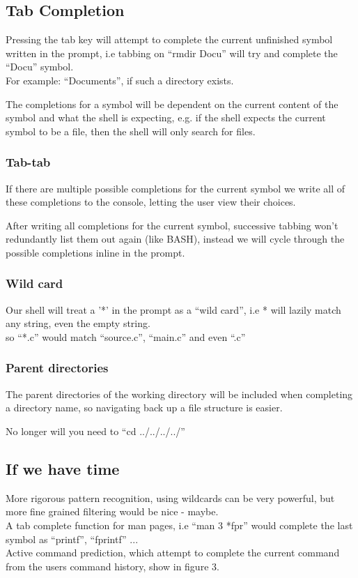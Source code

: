 \documentclass[a4paper,12pt]{article}
\begin{document}
\pagebreak
\subsection*{Tab Completion}

Pressing the tab key will attempt to complete the current unfinished symbol written in the prompt, i.e tabbing on ``rmdir Docu'' will try and complete the ``Docu'' symbol.\\
For example: ``Documents'', if such a directory exists.

The completions for a symbol will be dependent on the current content of the symbol and what the shell is expecting, e.g. if the shell expects the current symbol to be a file, then the shell will only search for files.

\subsubsection*{Tab-tab}
If there are multiple possible completions for the current symbol we write all of these completions to the console, letting the user view their choices.

After writing all completions for the current symbol, successive tabbing  won't redundantly list them out again (like BASH), instead we will cycle through the possible completions inline in the prompt.  

\subsubsection*{Wild card}
Our shell will treat a '*' in the prompt as a ``wild card'', i.e * will lazily match any string, even the empty string. \\
so ``*.c'' would match ``source.c'', ``main.c'' and even ``.c''

\subsubsection*{Parent directories}

The parent directories of the working directory will be included when completing a directory name, so navigating back up a file structure is easier.

No longer will you need to ``cd ../../../../''

\subsection*{If we have time}
More rigorous pattern recognition, using wildcards can be very powerful, but more fine grained filtering would be nice - maybe.\\[0.5cm]
A tab complete function for man pages, i.e ``man 3 *fpr'' would complete the last symbol as ``printf'',  ``fprintf'' ...\\[0.5cm]
Active command prediction, which attempt to complete the current command from the users command history, show in figure 3. 
\end{document}

